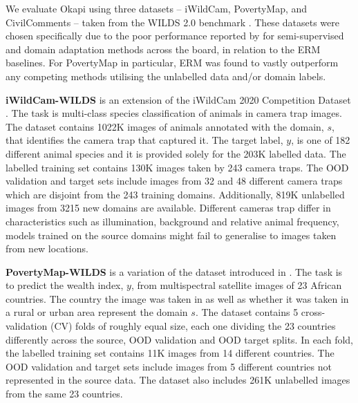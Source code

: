 We evaluate Okapi using three datasets -- iWildCam, PovertyMap, and CivilComments -- taken from the
WILDS 2.0 benchmark
\citep{SagWeiLeeGaoetal22}.
%
These datasets were chosen specifically due to the poor performance reported by
\cite{SagWeiLeeGaoetal22} for semi-supervised and domain adaptation methods across the board, in
relation to the ERM baselines.
%
For PovertyMap in particular, ERM was found to vastly outperform any competing methods utilising
the unlabelled data and/or domain labels.


\textbf{iWildCam-WILDS} is an extension of the iWildCam 2020 Competition Dataset
\cite{beery2020iwildcam}. 
%
The task is multi-class species classification  of animals in camera trap images. The dataset
contains 1022K images of animals annotated with the domain, $s$, that identifies the camera trap
that captured it. The target label, $y$, is one of 182 different animal species and it is provided
solely for the 203K labelled data. The labelled training set contains 130K images taken by 243 camera traps. 
%
The \ac{OOD} validation and target sets include images from 32 and 48 different camera traps which
are disjoint from the 243 training domains.
%
Additionally, 819K unlabelled images from 3215 new domains are available. %
Different cameras trap differ in characteristics such as illumination, background and relative
animal frequency, models trained on the source domains might fail to generalise to images taken
from new locations.


\textbf{PovertyMap-WILDS} is a variation of the dataset introduced in 
\cite{yeh2020using}. The task is to predict the wealth index, $y$, from multispectral satellite
images of 23 African countries. The country the image was taken in as well as whether it was taken
in a rural or urban area represent the domain $s$. The dataset contains 5 cross-validation (CV)
folds of roughly equal size, each one dividing the 23 countries differently across the source, OOD
validation and OOD target splits. In each fold, the labelled training set contains 11K images from
14 different countries. The OOD validation and target sets include images from 5 different
countries not represented in the source data.
%
The dataset also includes 261K unlabelled images from the same 23 countries. 

